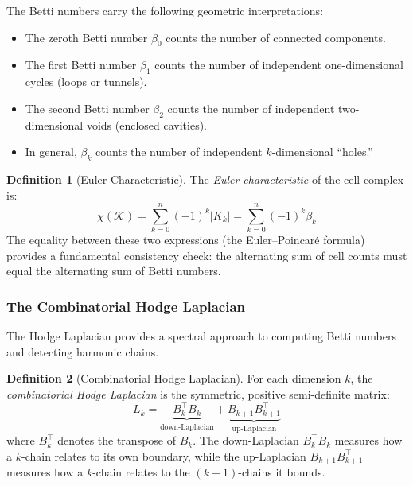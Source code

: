 \documentclass[manuscript, nonacm, review=false]{acmart}
\theoremstyle{definition}
\newtheorem{definition}{Definition}[section]
\theoremstyle{plain}
\newcommand{\K}{\mathcal{K}}
\begin{document}
The Betti numbers carry the following geometric interpretations:
\begin{itemize}
    \item The zeroth Betti number $\beta_0$ counts the number of connected components.
    \item The first Betti number $\beta_1$ counts the number of independent one-dimensional cycles (loops or tunnels).
    \item The second Betti number $\beta_2$ counts the number of independent two-dimensional voids (enclosed cavities).
    \item In general, $\beta_k$ counts the number of independent $k$-dimensional ``holes.''
\end{itemize}

\begin{definition}[Euler Characteristic]
\label{def:euler}
The \emph{Euler characteristic} of the cell complex is:
\begin{equation}
    \chi(\K) = \sum_{k=0}^{n} (-1)^k |K_k| = \sum_{k=0}^{n} (-1)^k \beta_k
    \label{eq:euler}
\end{equation}
The equality between these two expressions (the Euler--Poincar\'e formula) provides a fundamental consistency check: the alternating sum of cell counts must equal the alternating sum of Betti numbers.
\end{definition}


\subsubsection{The Combinatorial Hodge Laplacian}

The Hodge Laplacian provides a spectral approach to computing Betti numbers and detecting harmonic chains.

\begin{definition}[Combinatorial Hodge Laplacian]
\label{def:hodge}
For each dimension $k$, the \emph{combinatorial Hodge Laplacian} is the symmetric, positive semi-definite matrix:
\begin{equation}
    L_k = \underbrace{B_k^\top B_k}_{\text{down-Laplacian}} + \underbrace{B_{k+1} B_{k+1}^\top}_{\text{up-Laplacian}}
    \label{eq:hodge}
\end{equation}
where $B_k^\top$ denotes the transpose of $B_k$. The down-Laplacian $B_k^\top B_k$ measures how a $k$-chain relates to its own boundary, while the up-Laplacian $B_{k+1} B_{k+1}^\top$ measures how a $k$-chain relates to the $(k+1)$-chains it bounds.
\end{definition}
\end{document}
